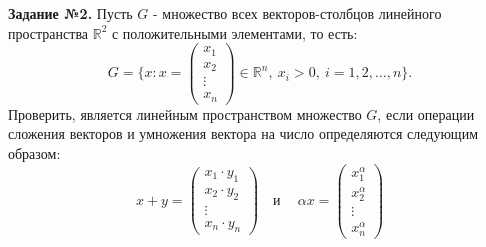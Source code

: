 \documentclass[a4paper, 12pt]{article}
\begin{document}
\textbf{Задание №2.} Пусть $G$ - множество всех векторов-столбцов линейного пространства $\mathbb{R}^2$ с положительными элементами, то есть:
\[
G = \{x: x=
\begin{pmatrix}
    x_1 \\
    x_2 \\ 
    \vdots \\ 
    x_n
\end{pmatrix}
\in \mathbb{R}^n, \ x_i > 0, \ i = 1,2,\dots,n\}.
\]
Проверить, является линейным пространством множество $G$, если операции сложения векторов и умножения вектора на число определяются следующим образом:
\[
x + y =
\begin{pmatrix}
    x_1 \cdot y_1 \\
    x_2 \cdot y_2 \\ 
    \vdots \\
    x_n \cdot y_n 
\end{pmatrix}
\quad \text{и} \quad\ \alpha x = 
\begin{pmatrix}
    x_1^\alpha \\
    x_2^\alpha \\ 
    \vdots \\
    x_n^\alpha 
\end{pmatrix}
\]

\vspace{0.5cm} 
\end{document}
